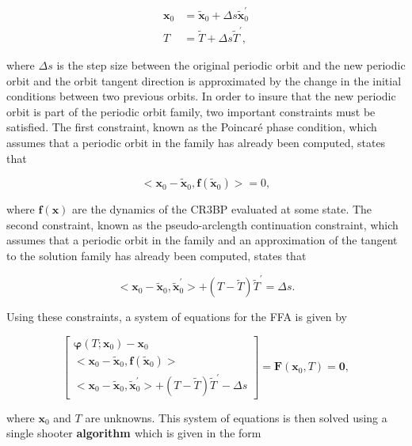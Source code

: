 \documentclass[11pt]{article} %
\begin{document}
\begin{align}
	\bm{x}_0 &= \tilde{\bm{x}}_0 + \Delta s\tilde{\bm{x}}_0^{\prime} \\
	T &= \tilde{T} + \Delta s\tilde{T}^{\prime},
\end{align}

\noindent
where $\Delta s$ is the step size between the original periodic orbit and the new periodic orbit and the orbit tangent direction is approximated by the change in the initial conditions between two previous orbits. In order to insure that the new periodic orbit is part of the periodic orbit family, two important constraints must be satisfied. The first constraint, known as the Poincar\'{e} phase condition, which assumes that a periodic orbit in the family has already been computed, states that 

\begin{equation}
	<\bm{x}_0 - \tilde{\bm{x}}_0, \bm{f}\left(\tilde{\bm{x}}_0\right)> = 0,
\end{equation}

\noindent
where $\bm{f}\left(\bm{x}\right)$ are the dynamics of the CR3BP evaluated at some state. The second constraint, known as the pseudo-arclength continuation constraint, which assumes that a periodic orbit in the family and an approximation of the tangent to the solution family has already been computed, states that

\begin{equation}
<\bm{x}_0 - \tilde{\bm{x}}_0, \tilde{\bm{x}}_0^{\prime}> + \left(T-\tilde{T}\right)\tilde{T}^{\prime} = \Delta s.
\end{equation}

\noindent
Using these constraints, a system of equations for the FFA is given by

\doublespace
\begin{equation}
	\label{e:ffa_constraints}
	\begin{bmatrix}
	\bm{\varphi}\left(T;\bm{x}_0\right) - \bm{x}_0 \\
	<\bm{x}_0 - \tilde{\bm{x}}_0, \bm{f}\left(\tilde{\bm{x}}_0\right)> \\
	<\bm{x}_0 - \tilde{\bm{x}}_0, \tilde{\bm{x}}_0^{\prime}> + \left(T-\tilde{T}\right)\tilde{T}^{\prime} - \Delta s
	\end{bmatrix} = \bm{F}\left(\bm{x}_0, T\right) = \bm{0},
\end{equation}
\singlespace

\noindent
where $\bm{x}_0$ and $T$ are unknowns. This system of equations is then solved using a single shooter \textbf{algorithm \cite{SingleShooter}} which is given in the form
\end{document}
